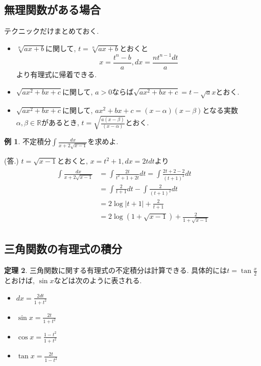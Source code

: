 \documentclass[dvipdfmx,a4paper,11pt]{article}
\newcommand{\R}{\mathbb{R}}
\theoremstyle{definition}
\newtheorem{thm}{定理}
\newtheorem{exa}[thm]{例}
\begin{document}
\subsection{無理関数がある場合}
テクニックだけまとめておく.
\begin{itemize}
\item $\sqrt[n]{ax + b}$に関して, $t= \sqrt[n]{ax + b}$とおくと
$$
x = \frac{t^n - b}{a}, dx = \frac{n t^{n-1} dt}{a}
$$
より有理式に帰着できる.
\item $\sqrt{ax^2 + b x + c}$に関して, $a>0$ならば$\sqrt{ax^2 + b x + c} = t - \sqrt{a} x$とおく.
\item $\sqrt{ax^2 + b x + c}$に関して, $ax^2 + b x + c = (x - \alpha)(x- \beta)$となる実数$\alpha, \beta \in \R$があるとき, $t = \sqrt{\frac{a(x - \beta)}{(x-\alpha)}}$とおく.
\end{itemize}

\begin{exa}
不定積分$\int \frac{dx}{x + 2 \sqrt{x-1}}$を求めよ.

\hspace{-18pt}(答.) $t = \sqrt{x-1}$とおくと, $x = t^2 +1, dx = 2tdt$より
\begin{align*}
\begin{split}
\int \frac{dx}{x + 2 \sqrt{x-1}}
&= \int \frac{2t}{t^2 + 1 + 2t} dt= \int \frac{2t + 2 -2}{(t + 1)^2} dt \\
&=  \int \frac{2}{t + 1} dt -  \int \frac{2}{(t + 1)^2} dt \\
&= 2 \log |t+1| + \frac{2}{t+1} \\
&= 2 \log (1 + \sqrt{x-1}) + \frac{2}{1 + \sqrt{x-1}}
\end{split}
\end{align*}

\end{exa}

\subsection{三角関数の有理式の積分}

\begin{tcolorbox}[
    colback = white,
    colframe = green!35!black,
    fonttitle = \bfseries,
    breakable = true]
    \begin{thm}
三角関数に関する有理式の不定積分は計算できる.
具体的には$t = \tan \frac{x}{2}$とおけば, $\sin x$などは次のように表される.
\begin{itemize}
\item $dx = \frac{2 dt}{1+ t^2}$
\item $\sin x = \frac{2t}{1+ t^2}$
\item $\cos x = \frac{1 - t^2}{1+ t^2}$
\item $\tan x = \frac{2t}{1- t^2}$
\end{itemize}


        \end{thm}
    \end{tcolorbox}
    
\end{document}
